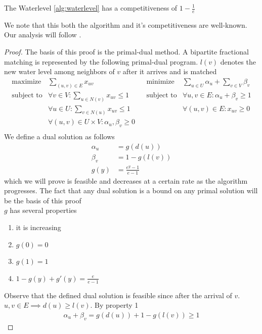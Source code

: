 \begin{theorem}
	\label{thm:waterlevel-comp}
	The Waterlevel \autoref{alg:waterlevel} has a competitiveness of $1-\frac{1}{e}$
\end{theorem}

We note that this both the algorithm and it's competitiveness are well-known. Our analysis will follow \cite{fractional}.

\begin{proof}
	The basis of this proof is the primal-dual method. A bipartite fractional matching is represented by the following primal-dual program. $l(v)$ denotes the new water level among neighbors of $v$ after it arrives and is matched
	\begin{align*}
		\text{maximize} & \sum\limits_{(u,v)\in E}x_{uv}&&
		\text{minimize} & \sum\limits_{u\in U}\alpha_u+\sum\limits_{v\in V}\beta_v\\
		\text{subject to} & \forall v\in V: \sum\limits_{u\in N(v)}x_{uv}\leq 1&&
		\text{subject to} & \forall u,v\in E: \alpha_u+\beta_v\geq 1\\
		& \forall u\in U: \sum\limits_{v\in N(u)}x_{uv}\leq 1&&
		& \forall (u,v)\in E: x_{uv}\geq 0\\
		& \forall (u,v)\in U\times V: \alpha_u,\beta_v\geq 0\\
	\end{align*}
	We define a dual solution as follows
	\begin{align*}
		\alpha_u&=g(d(u))\\
		\beta_v &=1-g(l(v))\\
		g(y)&=\frac{e^y-1}{e-1}
	\end{align*}
	which we will prove is feasible and decreases at a certain rate as the algorithm progresses. The fact that any dual solution is a bound on any primal solution will be the basis of this proof\\
	$g$ has several properties
	\begin{enumerate}
		\item it is increasing
		\item $g(0)=0$
		\item $g(1)=1$
		\item $1-g(y)+g'(y)=\frac{e}{e-1}$
	\end{enumerate}
	Observe that the defined dual solution is feasible since after the arrival of $v$. $u,v\in E\implies d(u)\geq l(v)$. By property 1
	\begin{align*}
		\alpha_u+\beta_v=g(d(u))+1-g(l(v))\geq 1
	\end{align*}

\end{proof}

